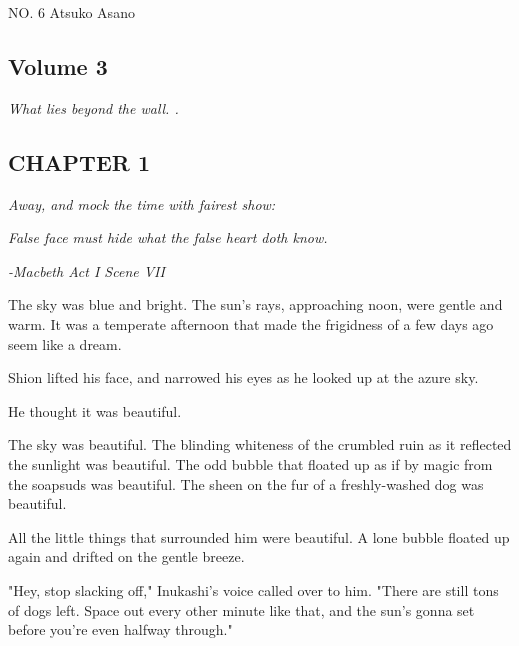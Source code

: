 \protect\hypertarget{titlepage.xhtml}{}{}

\protect\hypertarget{index_split_000.html}{}{}

NO. 6 \textbar{} Atsuko Asano

\protect\hypertarget{index_split_001_split_000.html}{}{}

\hypertarget{index_split_001_split_000.htmlux5cux23calibre_pb_0}{%
\subsection{Volume
3}\label{index_split_001_split_000.htmlux5cux23calibre_pb_0}}

\emph{What lies beyond the wall. .}

\hypertarget{index_split_001_split_000.htmlux5cux23calibre_pb_1}{}

\hypertarget{index_split_001_split_000.htmlux5cux23calibre_pb_0}{}

\hypertarget{index_split_001_split_000.htmlux5cux23calibre_toc_2}{%
\subsection{CHAPTER
1}\label{index_split_001_split_000.htmlux5cux23calibre_toc_2}}

\emph{Away, and mock the time with fairest show:}

\emph{False face must hide what the false heart doth know.}

\emph{-Macbeth Act I Scene VII}

The sky was blue and bright. The sun's rays, approaching noon, were
gentle and warm. It was a temperate afternoon that made the frigidness
of a few days ago seem like a dream.~

Shion lifted his face, and narrowed his eyes as he looked up at the
azure sky.

He thought it was beautiful.

The sky was beautiful. The blinding whiteness of the crumbled ruin as it
reflected the sunlight was beautiful. The odd bubble that floated up as
if by magic from the soapsuds was beautiful. The sheen on the fur of a
freshly-washed dog was beautiful.

All the little things that surrounded him were beautiful. A lone bubble
floated up again and drifted on the gentle breeze.

"Hey, stop slacking off," Inukashi's voice called over to him. "There
are still tons of dogs left. Space out every other minute like that, and
the sun's gonna set before you're even halfway through."

